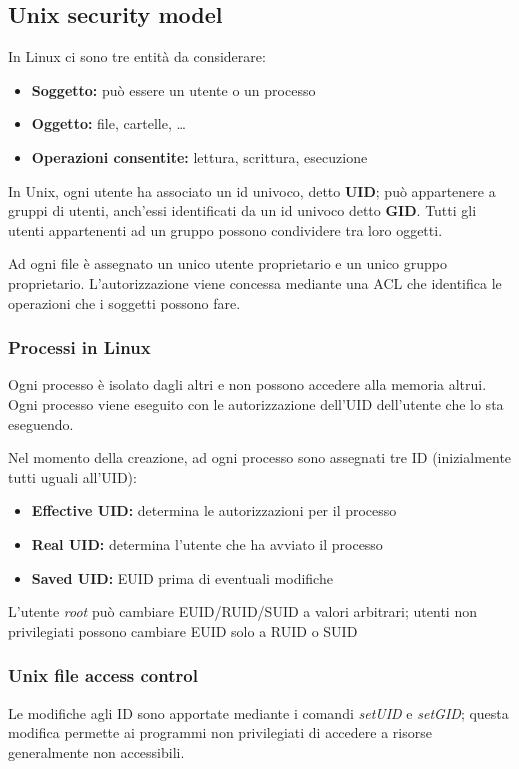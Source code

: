 \documentclass{report}
\begin{document}
\subsection{Unix security model}
In Linux ci sono tre entità da considerare:
\begin{itemize}
    \item \textbf{Soggetto:} può essere un utente o un processo 
    \item \textbf{Oggetto:} file, cartelle, \dots
    \item \textbf{Operazioni consentite:} lettura, scrittura, esecuzione 
\end{itemize}

\noindent In Unix, ogni utente ha associato un id univoco, detto \textbf{UID}; può appartenere a 
gruppi di utenti, anch'essi identificati da un id univoco detto \textbf{GID}. Tutti gli utenti 
appartenenti ad un gruppo possono condividere tra loro oggetti.

\noindent Ad ogni file è assegnato un unico utente proprietario e un unico gruppo proprietario. L'autorizzazione 
viene concessa mediante una ACL che identifica le operazioni che i soggetti possono fare.

\subsubsection{Processi in Linux}
Ogni processo è isolato dagli altri e non possono accedere alla memoria altrui. Ogni processo viene 
eseguito con le autorizzazione dell'UID dell'utente che lo sta eseguendo. 

\noindent Nel momento della creazione, ad ogni processo sono assegnati tre ID (inizialmente tutti uguali 
all'UID):
\begin{itemize}
    \item \textbf{Effective UID:} determina le autorizzazioni per il processo 
    \item \textbf{Real UID:} determina l'utente che ha avviato il processo 
    \item \textbf{Saved UID:} EUID prima di eventuali modifiche
\end{itemize}

\noindent L'utente \textit{root} può cambiare EUID/RUID/SUID a valori arbitrari; utenti non privilegiati
possono cambiare EUID solo a RUID o SUID

\subsubsection{Unix file access control}
Le modifiche agli ID sono apportate mediante i comandi \textit{setUID} e \textit{setGID}; questa modifica 
permette ai programmi non privilegiati di accedere a risorse generalmente non accessibili.
\end{document}
